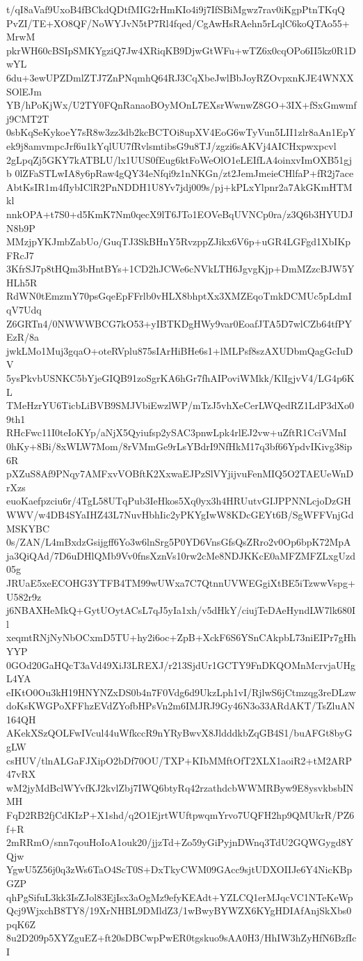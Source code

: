 t/qI8aVaf9UxoB4fBCkdQDtfMIG2rHmKIo4i9j7IfSBiMgwz7rav0iKgpPtnTKqQ
PvZI/TE+XO8QF/NoWYJvN5tP7Rl4fqed/CgAwHsRAehn5rLqlC6koQTAo55+MrwM
pkrWH60cBSIpSMKYgziQ7Jw4XRiqKB9DjwGtWFu+wTZ6x0cqOPo6II5kz0R1DwYL
6du+3ewUPZDmlZTJ7ZnPNqmhQ64RJ3CqXbeJwlBbJoyRZOvpxnKJE4WNXXSOlEJm
YB/hPoKjWx/U2TY0FQnRanaoBOyMOnL7EXsrWwnwZ8GO+3IX+fSxGmwmfj9CMT2T
0sbKqSeKykoeY7sR8w3zz3db2kcBCTOi8upXV4EoG6wTyVun5LII1zlr8aAn1EpY
ek9j8amvmpcJrf6u1kYqlUU7fRvlsmtibsG9u8TJ/zgzi6sAKVj4AICHxpwxpcvl
2gLpqZj5GKY7kATBLU/lx1UUS0fEug6ktFoWeOlO1eLEIfLA4oinxvImOXB51gjb
0lZFaSTLwIA8y6pRaw4gQY34eNfqi9z1nNKGn/zt2JemJmeieCHlfaP+fR2j7ace
AbtKsIR1m4fIybIClR2PnNDDH1U8Yv7jdj009s/pj+kPLxYlpnr2a7AkGKmHTMkl
nnkOPA+t7S0+d5KmK7Nm0qecX9lT6JTo1EOVeBqUVNCp0ra/z3Q6b3HYUDJN8b9P
MMzjpYKJmbZabUo/GuqTJ3SkBHnY5RvzppZJikx6V6p+uGR4LGFgd1XbIKpFRcJ7
3KfrSJ7p8tHQm3bHntBYs+1CD2hJCWe6cNVkLTH6JgvgKjp+DmMZzcBJW5YHLh5R
RdWN0tEmzmY70psGqeEpFFrlb0vHLX8bhptXx3XMZEqoTmkDCMUc5pLdmIqV7Udq
Z6GRTn4/0NWWWBCG7kO53+yIBTKDgHWy9var0EoafJTA5D7wlCZb64tfPYEzR/8a
jwkLMo1Muj3gqaO+oteRVplu875sIArHiBHe6s1+lMLPsf8szAXUDbmQagGcIuDV
5ysPkvbUSNKC5bYjeGIQB91zoSgrKA6hGr7fhAIPoviWMkk/KlIgjvV4/LG4p6KL
TMeHzrYU6TicbLiBVB9SMJVbiEwzlWP/mTzJ5vhXeCerLWQedRZ1LdP3dXo09th1
RHcFwc11I0teIoKYp/aNjX5Qyiufsp2ySAC3pnwLpk4rlEJ2vw+uZftR1CciVMnI
0hKy+8Bi/8xWLW7Mom/8rVMmGe9rLsYBdrI9NfHkM17q3bf66YpdvIKivg38ip6R
pXZuS8Af9PNqy7AMFxvVOBftK2XxwaEJPzSlVYjijvuFenMIQ5O2TAEUeWnDrXzs
euoKaefpzciu6r/4TgL58UTqPub3IeHkos5Xq0yx3h4HRUutvGIJPPNNLcjoDzGH
WWV/w4DB4SYaIHZ43L7NuvHbhIic2yPKYgIwW8KDcGEYt6B/SgWFFVnjGdMSKYBC
0s/ZAN/L4mBxdzGsijgff6Yo3w6lnSrg5P0YD6VnsGfsQsZRro2v0Op6bpK72MpA
ja3QiQAd/7D6uDHlQMb9Vv0fnsXznVs10rw2cMe8NDJKKcE0aMFZMFZLxgUzd05g
JRUaE5xeECOHG3YTFB4TM99wUWxa7C7QtnnUVWEGgiXtBE5iTzwwVspg+U582r9z
j6NBAXHeMkQ+GytUOytACsL7qJ5yIa1xh/v5dHkY/ciujTeDAeHyndLW7lk680Il
xeqmtRNjNyNbOCxmD5TU+hy2i6oc+ZpB+XckF6S6YSnCAkpbL73niEIPr7gHhYYP
0GOd20GaHQcT3aVd49XiJ3LREXJ/r213SjdUr1GCTY9FnDKQOMnMcrvjaUHgL4YA
eIKtO0Ou3kH19HNYNZxDS0b4n7F0Vdg6d9UkzLph1vI/RjlwS6jCtmzqg3reDLzw
doKsKWGPoXFFhzEVdZYofbHPsVn2m6IMJRJ9Gy46N3o33ARdAKT/TsZluAN164QH
AKekXSzQOLFwIVcul44uWfkccR9nYRyBwvX8JldddkbZqGB4S1/buAFGt8byGgLW
csHUV/tlnALGaFJXipO2bDf70OU/TXP+KIbMMftOfT2XLX1aoiR2+tM2ARP47vRX
wM2jyMdBclWYvfKJ2kvlZbj7IWQ6btyRq42rzathdcbWWMRByw9E8ysvkbsbINMH
FqD2RB2fjCdKIzP+X1shd/q2O1EjrtWUftpwqmYrvo7UQFH2hp9QMUkrR/PZ6f+R
2mRRmO/snn7qouHoIoA1ouk20/jjzTd+Zo59yGiPyjnDWnq3TdU2GQWGygd8YQjw
YgwU5Z56j0q3zWs6TaO4ScT0S+DxTkyCWM09GAcc9sjtUDXOIIJe6Y4NicKBpGZP
qhPgSifuL3kk3IsZJol83EjIsx3aOgMz9efyKEAdt+YZLCQ1erMJqcVC1NTeKeWp
Qcj9WjxchB8TY8/19XrNHBL9DMldZ3/1wBwyBYWZX6KYgHDIAfAnjSkXbs0pqK6Z
8u2D209p5XYZguEZ+ft20sDBCwpPwER0tgskuo9sAA0H3/HhIW3hZyHfN6BzfIcI
